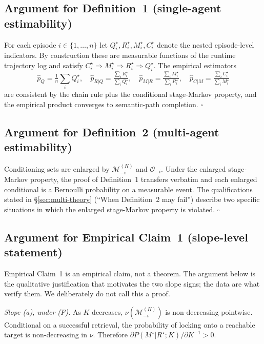 \documentclass{article}
\begin{document}
\subsection{Argument for Definition~1 (single-agent estimability)}

For each episode $i \in \{1,\dots,n\}$ let $Q_i^\star, R_i^\star, M_i^\star, C_i^\star$ denote the nested episode-level indicators. By construction these are measurable functions of the runtime trajectory log and satisfy $C_i^\star \Rightarrow M_i^\star \Rightarrow R_i^\star \Rightarrow Q_i^\star$. The empirical estimators
\[
\hat p_Q = \tfrac{1}{n}\sum_i Q_i^\star,\quad
\hat p_{R|Q} = \tfrac{\sum_i R_i^\star}{\sum_i Q_i^\star},\quad
\hat p_{M|R} = \tfrac{\sum_i M_i^\star}{\sum_i R_i^\star},\quad
\hat p_{C|M} = \tfrac{\sum_i C_i^\star}{\sum_i M_i^\star}
\]
are consistent by the chain rule plus the conditional stage-Markov property, and the empirical product converges to semantic-path completion. \hfill$\square$

\subsection{Argument for Definition~2 (multi-agent estimability)}

Conditioning sets are enlarged by $\mathcal{M}_{-i}^{(K)}$ and $\mathcal{O}_{-i}$. Under the enlarged stage-Markov property, the proof of Definition~1 transfers verbatim and each enlarged conditional is a Bernoulli probability on a measurable event. The qualifications stated in \S\ref{sec:multi-theory} (``When Definition~2 may fail'') describe two specific situations in which the enlarged stage-Markov property is violated. \hfill$\square$

\subsection{Argument for Empirical Claim~1 (slope-level statement)}

Empirical Claim~1 is an empirical claim, not a theorem. The argument below is the qualitative justification that motivates the two slope signs; the data are what verify them. We deliberately do not call this a proof.

\emph{Slope (a), under (F).} As $K$ decreases, $\nu(\mathcal{M}_{-i}^{(K)})$ is non-decreasing pointwise. Conditional on a successful retrieval, the probability of locking onto a reachable target is non-decreasing in $\nu$. Therefore $\partial P(M^\star|R^\star;K) / \partial K^{-1} > 0$.
\end{document}
